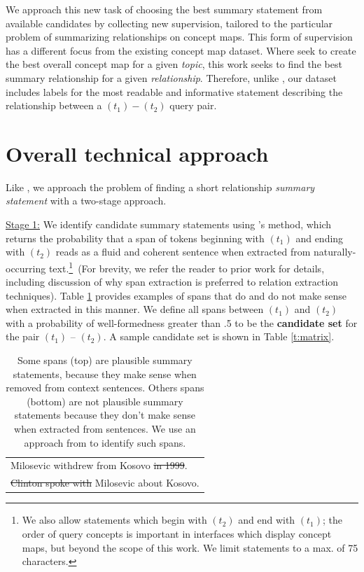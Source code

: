\documentclass[11pt,a4paper]{article}
\begin{document}
We approach this new task of choosing the best summary statement from available candidates by collecting new supervision, tailored to the particular problem of summarizing relationships on concept maps. This form of supervision has a different focus from the existing \citet{emnlp2017conceptmaps} concept map dataset. Where \citet{emnlp2017conceptmaps} seek to create the best overall concept map for a given \textit{topic}, this work seeks to find the best summary relationship for a given \textit{relationship}. Therefore, unlike  \citet{emnlp2017conceptmaps}, our dataset includes labels for the most readable and informative statement describing the relationship between a $(t_1)-(t_2)$ query pair. 


\section{Overall technical approach}\label{s:approach}

Like \citet{N18-1159}, we approach the problem of finding a short relationship \textit{summary statement} with a two-stage approach. 

\underline{Stage 1:} We identify candidate summary statements using \citet{N18-1159}'s method, which returns the probability that a span of tokens beginning with $(t_1)$ and ending with $(t_2)$ reads as a fluid and coherent sentence when extracted from naturally-occurring text.\footnote{We also allow statements which begin with $(t_2)$ and end with $(t_1)$; the order of query concepts is important in interfaces which display concept maps, but beyond the scope of this work. We limit statements to a max. of 75 characters.}\ (For brevity, we refer the reader to prior work for details, including discussion of why span extraction is preferred to relation extraction techniques). Table \ref{t:spans} provides examples of spans that do and do not make sense when extracted in this manner. We define all spans between $(t_1)$ and $(t_2)$ with a probability of well-formedness greater than .5 to be the \textbf{candidate set} for the pair $(t_1)$ -- $(t_2)$. A sample candidate set is shown in Table \ref{t:matrix}. 

 \begin{table}[htbp!]
\begin{tabular}{p{7.1cm}}  \toprule %
Milosevic withdrew from Kosovo \sout{in 1999}.\\ 
\sout{Clinton spoke with} Milosevic about Kosovo.\\ \toprule
\end{tabular}
\caption{Some spans (top) are plausible summary statements, because they make sense when removed from context sentences. Others spans (bottom) are not plausible summary statements because they don't make sense when extracted from sentences. We use an approach from \citet{N18-1159} to identify such spans.}
\label{t:spans}
\end{table}
\end{document}
